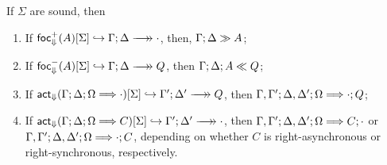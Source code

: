 \begin{lemma}\label{fsoundnesslemma}
  If $\Sigma$ are sound, then

  \begin{enumerate}
  \item If $\relj{\frfrel{A}}{\Sigma}{\fneuseq{\Gamma}{\Delta}{\cdot}}$,
    then, $\Gamma; \Delta \gg A$;
  \item If $\relj{\flfrel{A}}{\Sigma}{\fneuseq{\Gamma}{\Delta}{Q}}$,
    then $\Gamma; \Delta; A \ll Q$;
  \item If
    $\relj{\factrel{\btriseq{\Gamma}{\Delta}{\Omega}{\cdot}}}{\Sigma}
    {\fneuseq{\Gamma'}{\Delta'}{Q}}$, then
    $\Gamma, \Gamma'; \Delta, \Delta'; \Omega \Longrightarrow \cdot ; Q$;
  \item If
    $\relj{\factrel{\btriseq{\Gamma}{\Delta}{\Omega}{C}}}{\Sigma}
    {\fneuseq{\Gamma'}{\Delta'}{\cdot}}$, then
    $\Gamma, \Gamma'; \Delta, \Delta'; \Omega \Longrightarrow C ; \cdot$ or
    $\Gamma, \Gamma'; \Delta, \Delta'; \Omega \Longrightarrow \cdot ; C$, depending
    on whether $C$ is right-asynchronous or right-synchronous, respectively.
  \end{enumerate}
\end{lemma}
